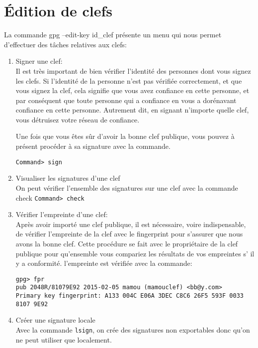 \section{Édition de clefs}

La commande gpg --edit-key id\_clef 
présente un menu qui nous permet d’effectuer des tâches relatives aux clefs:\\
\begin{enumerate}

\item Signer une clef:\\
Il est très important de bien vérifier l'identité des personnes dont vous signez les clefs. Si l'identité de la personne n'est pas 
vérifiée correctement, et que vous signez la clef, cela signifie que vous avez confiance en cette personne, et par conséquent que 
toute personne qui a confiance en vous a dorénavant confiance en cette personne. Autrement dit, en signant n'importe quelle clef, vous détruisez
votre réseau de confiance.

Une fois que vous êtes sûr d'avoir la bonne clef publique, vous pouvez à présent procéder à sa signature avec la commande.

\texttt{Command> sign}\\ 

\item Visualiser les signatures d'une clef\\
On peut vérifier l'ensemble des signatures sur une clef avec la commande check
\texttt{Command> check }
\item Vérifier l'empreinte d'une clef:\\
Après avoir importé une clef publique, il est nécessaire, voire indispensable, de vérifier l'empreinte de la clef avec le fingerprint 
pour s'assurer que nous avons la bonne clef. Cette procédure se fait avec le propriétaire de la clef publique pour qu'ensemble vous 
compariez les résultats de vos empreintes s’ il y a conformité. l'empreinte est vérifiée avec la commande:

\texttt{gpg> fpr\\
pub   2048R/81079E92 2015-02-05 mamou (mamouclef) <bb@y.com>\\
 Primary key fingerprint: A133 004C E06A 3DEC C8C6  26F5 593F 0033 8107 9E92} \\





\item Créer une signature locale\\
Avec la commande \texttt{lsign}, on crée des signatures non exportables donc qu'on ne peut utiliser que localement.


\end{enumerate}
